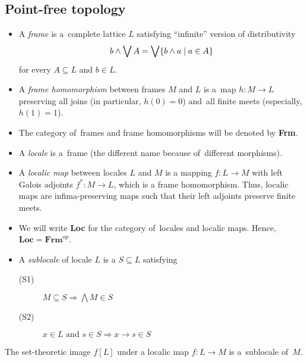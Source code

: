 \subsection*{Point-free topology}

\begin{itemize}
\item A \emph{frame} is a~complete lattice $L$ satisfying ``infinite'' version
of distributivity
\[
  b \wedge \bigvee A = \bigvee \{ b \wedge a \mid a\in A \}
\]
for every $A\subseteq L$ and $b\in L$.

\item A \emph{frame homomorphism} between frames $M$ and $L$ is a~map $h\colon
M \to L$ preserving all joins (in particular, $h(0) = 0$) and~all finite meets
(especially, $h(1) = 1$).

\item The category of~frames and frame homomorphisms will be denoted by {\bf
Frm}.

\item A \emph{locale} is a~frame (the different name because of~different
morphisms).

\item A \emph{localic map} between locales $L$ and $M$ is a mapping $f\colon L
\to M$ with left Galois adjoints $f^*\colon M \to L$, which is a frame
homomorphism.
Thus, localic maps are infima-preserving maps such that their left adjoints
preserve finite meets.

\item We will write {\bf Loc} for the category of~locales and localic maps.
Hence, $\mathbf{Loc} = \mathbf{Frm}^{op}$.

\item A \emph{sublocale} of locale $L$ is a $S\subseteq L$ satisfying
  \begin{description}
  \item[(S1)] $M\subseteq S \Longrightarrow \bigwedge M\in S$
  \item[(S2)] $x\in L \text{ and } s\in S \Longrightarrow x \rightarrow s \in S$ 
  \end{description}
\end{itemize}

\begin{fact}
  The set-theoretic image $f[L]$ under a localic map $f\colon L\to M$
  is a~sublocale of~$M$.
\end{fact}


